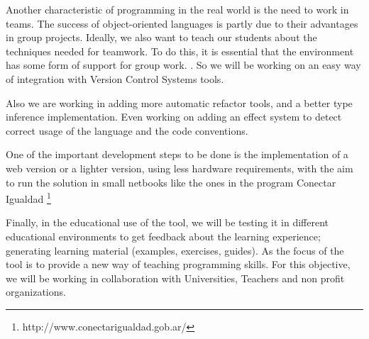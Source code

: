 Another characteristic of programming in the real world is the need to work in
teams. The success of object-oriented languages is partly due to their advantages in
group projects. Ideally, we also want to teach our students about the techniques
needed for teamwork. To do this, it is essential that the environment has some form
of support for group work. \cite{kolling_problem_1999}. So we will be working on an easy way of integration with Version Control Systems tools.

Also we are working in adding more automatic refactor tools, and a better type inference implementation. Even working on adding an effect system to detect correct usage of the language and the code conventions.

One of the important development steps to be done is the implementation of a web version or a lighter version, using less hardware requirements, with the aim to run the solution in small netbooks like the ones in the program Conectar Igualdad \footnote{http://www.conectarigualdad.gob.ar/}

Finally, in the educational use of the tool, we will be testing it in different educational environments to get feedback about the learning experience; generating learning material (\eg examples, exercises, guides). As the focus of the tool is to provide a new way of teaching programming skills. For this objective, we will be working in collaboration with Universities, Teachers and non profit organizations.
